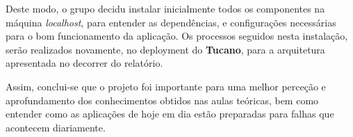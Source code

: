 \hspace{5mm} Deste modo, o grupo decidu instalar inicialmente todos os componentes na máquina \emph{localhost}, para entender as dependências, e configurações necessárias para o bom funcionamento da aplicação. Os processos seguidos nesta instalação, serão realizados novamente, no deployment do \textbf{Tucano}, para a arquitetura apresentada no decorrer do relatório. 

Assim, conclui-se que o projeto foi importante para uma melhor perceção e aprofundamento dos conhecimentos obtidos nas aulas teóricas, bem como entender como as aplicações de hoje em dia estão preparadas para falhas que acontecem diariamente.